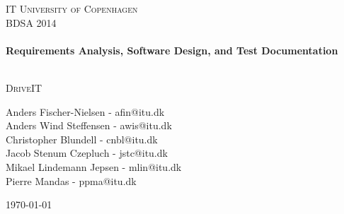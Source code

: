 


%


\begin{center}
\thispagestyle{empty}


\textsc{\LARGE IT University of Copenhagen}\\[1.5cm]

\textsc{\Large BDSA 2014 }\\[0.5cm]

\HRule \\[0.4cm]
{ \huge \bfseries Requirements Analysis, Software Design, and Test Documentation \\ [0.4cm]
    }

\HRule \\[1cm]

\textsc{\Large DriveIT}\\[1.5cm]

\begin{minipage}{1\textwidth}
\begin{center} \large
Anders Fischer-Nielsen - afin@itu.dk\\
Anders Wind Steffensen - awis@itu.dk\\
Christopher Blundell - cnbl@itu.dk\\
Jacob Stenum Czepluch - jstc@itu.dk\\
Mikael Lindemann Jepsen - mlin@itu.dk\\
Pierre Mandas - ppma@itu.dk\\
\end{center}
\end{minipage}


\vfill

{\large \today}

\end{center}

\frontmatter%

%
%


\tableofcontents*
\newpage
\listoffigures
\newpage

\mainmatter%











